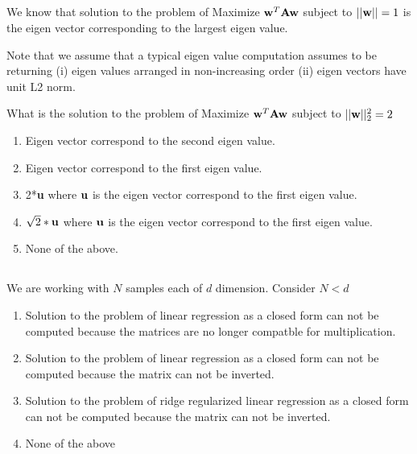 \begin{frame}
\section{}
We know that solution to the problem of Maximize ${\bf w}^T{\bf A}{\bf w}$ subject to $||{\bf w}|| = 1$ is the eigen vector corresponding to the largest eigen value.

Note that we assume that a typical eigen value computation assumes to be returning (i) eigen values arranged in non-increasing order (ii) eigen vectors have unit L2 norm.

What is the solution to the problem of
Maximize ${\bf w}^T{\bf A}{\bf w}$ subject to $||{\bf w}||^2_2 = 2$

\begin{enumerate}
\item Eigen vector correspond to the second  eigen value.
\item Eigen vector correspond to the first eigen value.
\item 2*{\bf u} where ${\bf u}$ is the eigen vector correspond to the first eigen value.
\item $\sqrt{2}*{\bf u}$ where ${\bf u}$ is the eigen vector correspond to the first eigen value.   %
\item None of the above.    %
\end{enumerate}
\end{frame}

\begin{frame}
\section{}
We are working with $N$ samples each of $d$ dimension.
Consider $N< d$

\begin{enumerate}
\item Solution to the problem of linear regression as a closed form can not be computed because the matrices are no longer compatble for multiplication.
\item Solution to the problem of linear regression as a closed form can not be computed because the matrix can not be inverted.   %
\item Solution to the problem of ridge regularized linear regression as a closed form can not be computed because the matrix can not be inverted.
\item None of the above   %
\end{enumerate}
\end{frame}

